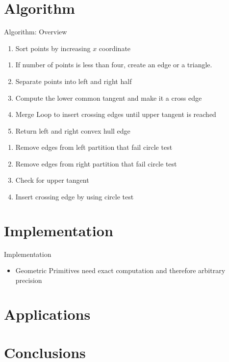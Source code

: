 \documentclass[aspectratio=169,fleqn]{beamer}
\begin{document}
\section{Algorithm}
  \begin{frame}{Algorithm: Overview}
    \begin{enumerate}
      \item Sort points by increasing $x$ coordinate
    \end{enumerate}
    \begin{enumerate}
      \item If number of points is less than four, create an edge or a triangle.
      \item Separate points into left and right half
      \item Compute the lower common tangent and make it a cross edge
      \item Merge Loop to insert crossing edges until upper tangent is reached
      \item Return left and right convex hull edge
    \end{enumerate}
    \begin{enumerate}
      \item Remove edges from left partition that fail circle test
      \item Remove edges from right partition that fail circle test
      \item Check for upper tangent
      \item Insert crossing edge by using circle test
    \end{enumerate}
  \end{frame}

\section{Implementation}
  \begin{frame}{Implementation}
    \begin{itemize}
      \item Geometric Primitives need exact computation and therefore arbitrary precision
    \end{itemize}
  \end{frame}

\section{Applications}

\section{Conclusions}
\end{document}
